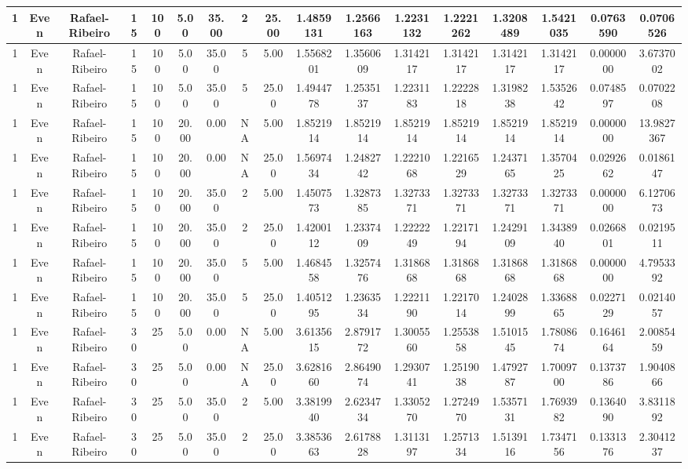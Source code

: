 \begin{longtable}{ | c | c | c | c | c | c | c | c | c | c | c | c | c | c | c | c | c | }
	\hline
	1	&	Even	&	Rafael-Ribeiro	&	15	&	100	&	5.00	&	35.00	&	2	&	25.00	&	1.4859131	&	1.2566163	&	1.2231132	&	1.2221262	&	1.3208489	&	1.5421035	&	0.0763590	&	0.0706526 \\
	\hline
	1	&	Even	&	Rafael-Ribeiro	&	15	&	100	&	5.00	&	35.00	&	5	&	5.00	&	1.5568201	&	1.3560609	&	1.3142117	&	1.3142117	&	1.3142117	&	1.3142117	&	0.0000000	&	3.6737002 \\
	\hline
	1	&	Even	&	Rafael-Ribeiro	&	15	&	100	&	5.00	&	35.00	&	5	&	25.00	&	1.4944778	&	1.2535137	&	1.2231183	&	1.2222818	&	1.3198238	&	1.5352642	&	0.0748597	&	0.0702208 \\
	\hline
	1	&	Even	&	Rafael-Ribeiro	&	15	&	100	&	20.00	&	0.00	&	NA	&	5.00	&	1.8521914	&	1.8521914	&	1.8521914	&	1.8521914	&	1.8521914	&	1.8521914	&	0.0000000	&	13.9827367 \\
	\hline
	1	&	Even	&	Rafael-Ribeiro	&	15	&	100	&	20.00	&	0.00	&	NA	&	25.00	&	1.5697434	&	1.2482742	&	1.2221068	&	1.2216529	&	1.2437165	&	1.3570425	&	0.0292662	&	0.0186147 \\
	\hline
	1	&	Even	&	Rafael-Ribeiro	&	15	&	100	&	20.00	&	35.00	&	2	&	5.00	&	1.4507573	&	1.3287385	&	1.3273371	&	1.3273371	&	1.3273371	&	1.3273371	&	0.0000000	&	6.1270673 \\
	\hline
	1	&	Even	&	Rafael-Ribeiro	&	15	&	100	&	20.00	&	35.00	&	2	&	25.00	&	1.4200112	&	1.2337409	&	1.2222249	&	1.2217194	&	1.2429109	&	1.3438940	&	0.0266801	&	0.0219511 \\
	\hline
	1	&	Even	&	Rafael-Ribeiro	&	15	&	100	&	20.00	&	35.00	&	5	&	5.00	&	1.4684558	&	1.3257476	&	1.3186868	&	1.3186868	&	1.3186868	&	1.3186868	&	0.0000000	&	4.7953392 \\
	\hline
	1	&	Even	&	Rafael-Ribeiro	&	15	&	100	&	20.00	&	35.00	&	5	&	25.00	&	1.4051295	&	1.2363534	&	1.2221190	&	1.2217014	&	1.2402899	&	1.3368865	&	0.0227129	&	0.0214057 \\
	\hline
	1	&	Even	&	Rafael-Ribeiro	&	30	&	25	&	5.00	&	0.00	&	NA	&	5.00	&	3.6135615	&	2.8791772	&	1.3005560	&	1.2553858	&	1.5101545	&	1.7808674	&	0.1646164	&	2.0085459 \\
	\hline
	1	&	Even	&	Rafael-Ribeiro	&	30	&	25	&	5.00	&	0.00	&	NA	&	25.00	&	3.6281660	&	2.8649074	&	1.2930741	&	1.2519038	&	1.4792787	&	1.7009700	&	0.1373786	&	1.9040866 \\
	\hline
	1	&	Even	&	Rafael-Ribeiro	&	30	&	25	&	5.00	&	35.00	&	2	&	5.00	&	3.3819940	&	2.6234734	&	1.3305270	&	1.2724970	&	1.5357131	&	1.7693982	&	0.1364090	&	3.8311892 \\
	\hline
	1	&	Even	&	Rafael-Ribeiro	&	30	&	25	&	5.00	&	35.00	&	2	&	25.00	&	3.3853663	&	2.6178828	&	1.3113197	&	1.2571334	&	1.5139116	&	1.7347156	&	0.1331376	&	2.3041237 \\

\end{longtable}
